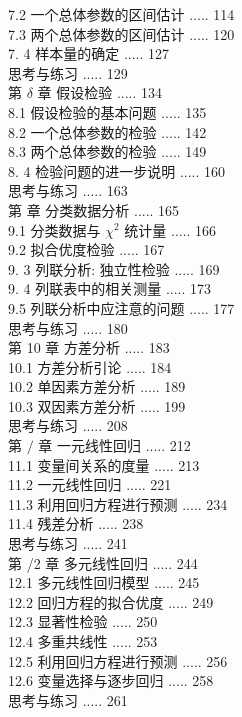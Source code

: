\documentclass[10pt]{article}
\begin{document}
\begin{CJK*}{UTF8}{bsmi}
7.2 一个总体参数的区间估计 ..... 114\\
7.3 两个总体参数的区间估计 ..... 120\\
7. 4 样本量的确定 ..... 127\\
思考与练习 ..... 129\\
第 $\delta$ 章 假设检验 ..... 134\\
8.1 假设检验的基本问题 ..... 135\\
8.2 一个总体参数的检验 ..... 142\\
8.3 两个总体参数的检验 ..... 149\\
8. 4 检验问题的进一步说明 ..... 160\\
思考与练习 ..... 163\\
第 章 分类数据分析 ..... 165\\
9.1 分类数据与 $\chi^{2}$ 统计量 ..... 166\\
9.2 拟合优度检验 ..... 167\\
9. 3 列联分析: 独立性检验 ..... 169\\
9. 4 列联表中的相关测量 ..... 173\\
9.5 列联分析中应注意的问题 ..... 177\\
思考与练习 ..... 180\\
第 10 章 方差分析 ..... 183\\
10.1 方差分析引论 ..... 184\\
10.2 单因素方差分析 ..... 189\\
10.3 双因素方差分析 ..... 199\\
思考与练习 ..... 208\\
第 $/$ 章 一元线性回归 ..... 212\\
11.1 变量间关系的度量 ..... 213\\
11.2 一元线性回归 ..... 221\\
11.3 利用回归方程进行预测 ..... 234\\
11.4 残差分析 ..... 238\\
思考与练习 ..... 241\\
第 /2 章 多元线性回归 ..... 244\\
12.1 多元线性回归模型 ..... 245\\
12.2 回归方程的拟合优度 ..... 249\\
12.3 显著性检验 ..... 250\\
12.4 多重共线性 ..... 253\\
12.5 利用回归方程进行预测 ..... 256\\
12.6 变量选择与逐步回归 ..... 258\\
思考与练习 ..... 261\\

\end{CJK*}
\end{document}
